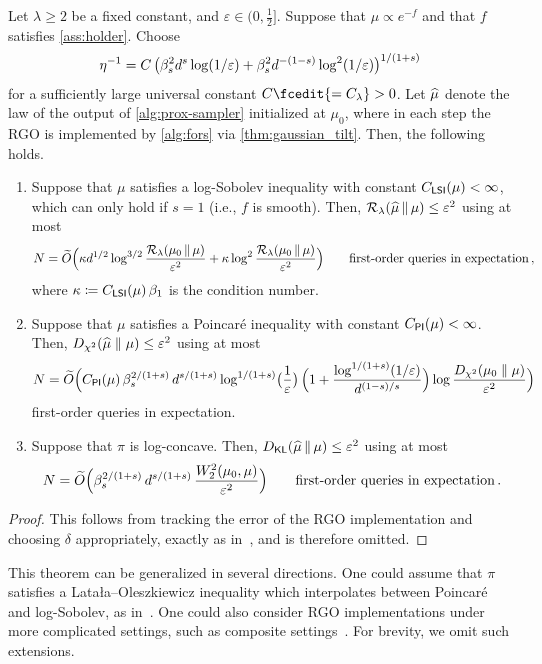 \begin{theorem}
    Let $\lambda\geq 2$ be a fixed constant, and $\varepsilon\in(0,\frac12]$.
    Suppose that $\mu\propto e^{-f}$ and that $f$ satisfies \cref{ass:holder}.
    Choose
    \begin{align*}
        \eta^{-1} = C\,\prn[\big]{\beta_s^2 d^s\log(1/\varepsilon) + \beta_s^2 d^{-(1-s)} \log^2(1/\varepsilon)}^{1/(1+s)}
    \end{align*}
    for a sufficiently large universal constant $C\fcedit{=C_\lambda} > 0$.
    Let $\wh\mu$ denote the law of the output of \cref{alg:prox-sampler} initialized at $\mu_0$, where in each step the RGO is implemented by \cref{alg:fors} via \cref{thm:gaussian_tilt}.
    Then, the following holds. 
    \begin{enumerate}
        \item Suppose that $\mu$ satisfies a log-Sobolev inequality with constant $\CLSI(\mu) < \infty$, which can only hold if $s = 1$ (i.e., $f$ is smooth).
        Then, $\Ren{\wh\mu}{\mu} \le \varepsilon^2$ using at most
        \begin{align*}
            N = \wt O\prn[\Big]{\kappa d^{1/2} \log^{3/2} \frac{\Ren{\mu_0}{\mu}}{\varepsilon^2} + \kappa \log^2 \frac{\Ren{\mu_0}{\mu}}{\varepsilon^2}} \qquad\text{first-order queries in expectation}\,,
        \end{align*}
        where $\kappa \deq \CLSI(\mu)\, \beta_1$ is the condition number. %
        \item Suppose that $\mu$ satisfies a Poincar\'e inequality with constant $\CPI(\mu) < \infty$.
        Then, $\Dchis{\wh\mu}{\mu} \le \varepsilon^2$ using at most
        \begin{align*}
            N = \wt O\prn[\Big]{\CPI(\mu)\,\beta_s^{2/(1+s)}\,d^{s/(1+s)} \log^{1/(1+s)}\prn[\big]{\frac{1}{\varepsilon}} \,\prn[\Big]{1 + \frac{\log^{1/(1+s)}(1/\varepsilon)}{d^{(1-s)/s}}}\log \frac{\Dchis{\mu_0}{\mu}}{\varepsilon^2}}
        \end{align*}
        first-order queries in expectation.
        \item Suppose that $\pi$ is log-concave.
        Then, $\Dkl{\wh\mu}{\mu} \le \varepsilon^2$ using at most
        \begin{align*}
            N = \wt O\prn[\Big]{\beta_s^{2/(1+s)}\,d^{s/(1+s)} \,\frac{W_2^2(\mu_0,\mu)}{\varepsilon^2}}\qquad\text{first-order queries in expectation}\,.
        \end{align*}
    \end{enumerate}
\end{theorem}
\begin{proof}
    This follows from tracking the error of the RGO implementation and choosing $\delta$ appropriately, exactly as in~\citet{AltChe24Warm}, and is therefore omitted.
\end{proof}

This theorem can be generalized in several directions.
One could assume that $\pi$ satisfies a Lata\l{}a--Oleszkiewicz inequality which interpolates between Poincar\'e and log-Sobolev, as in~\citet{Chen+22ProxSampler, Che+24LMC}.
One could also consider RGO implementations under more complicated settings, such as composite settings~\citep{FanYuaChe23ImprovedProx}.
For brevity, we omit such extensions.
